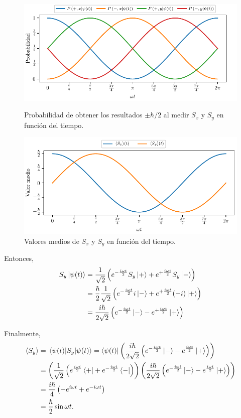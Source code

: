 \documentclass[10pt, a4paper]{article}
\newcommand{\wt}{\omega t}
\numberwithin{equation}{subsection}
\begin{document}
\begin{figure}[tb]
  \centering
  \includegraphics{images/spinevol_prob_sxsy.pdf}
  \caption{Probabilidad de obtener los resultados $\pm\hbar/2$ al medir $S_x$ y
    $S_y$ en función del tiempo.\label{fig:prob_sxsy_t}}

  \vspace*{\floatsep}%

  \includegraphics{images/spinevol_expval_sxsy.pdf}
  \caption{Valores medios de $S_x$ y $S_y$ en función del
    tiempo.\label{fig:expval_sxsy_t}}
\end{figure}

Entonces,
\begin{align}
  S_y\ket{\psi(t)} &= \frac{1}{\sqrt{2}}
    \left(e^{-\frac{i\wt}{2}}S_y\ket{+} + e^{+\frac{i\wt}{2}}S_y\ket{-}\right)
    \nonumber \\
  &= \frac{\hbar}{2}\frac{1}{\sqrt{2}}
    \left(e^{-\frac{i\wt}{2}}i\ket{-} + e^{+\frac{i\wt}{2}}(-i)\ket{+}\right)
    \nonumber \\
  &= \frac{i\hbar}{2\sqrt{2}}
    \left(e^{-\frac{i\wt}{2}}\ket{-} - e^{+\frac{i\wt}{2}}\ket{+}\right)
\end{align}

Finalmente,
\begin{align}
  \expval{S_y} &= \expval{S_y}{\psi(t)}
    = \bra{\psi(t)}\left(\frac{i\hbar}{2\sqrt{2}}
    \left(e^{-\frac{i\wt}{2}}\ket{-} - e^{\frac{i\wt}{2}}\ket{+}\right)\right)
    \nonumber \\
  &= \left(\frac{1}{\sqrt{2}}\left(e^{\frac{i\wt}{2}}\bra{+} +
    e^{-\frac{i\wt}{2}}\bra{-}\right) \right) \left(\frac{i\hbar}{2\sqrt{2}}
    \left(e^{-\frac{i\wt}{2}}\ket{-} - e^{\frac{i\wt}{2}}\ket{+}\right)\right)
    \nonumber \\
  &= \frac{i\hbar}{4} \left(-e^{i\wt} + e^{-i\wt}\right)
    \nonumber \\
  &= \frac{\hbar}{2} \sin\wt. \label{eq:spinevol_expval_sy}
\end{align}
\end{document}
